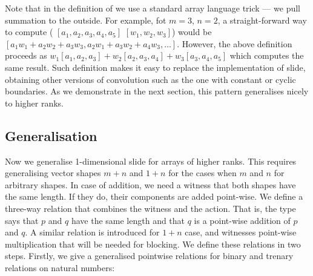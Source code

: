 Note that in the definition of  we use a standard array language
trick --- we pull summation to the outside.  For example, fot $m = 3$, $n = 2$,
a straight-forward way to compute ( $[a_1, a_2, a_3, a_4, a_5]$
$[w_1, w_2, w_3]$) would be $[a_1w_1 + a_2w_2 + a_3w_3, a_2w_1 + a_3w_2 +
a_4w_3,\dots]$.  However, the above definition proceeds as $w_1[a_1,a_2,a_3] +
w_2[a_2,a_3,a_4] + w_3[a_3,a_4,a_5]$ which computes the same result.  Such
definition makes it easy to replace the implementation of slide, obtaining
other versions of convolution such as the one with constant or cyclic
boundaries.  As we demonstrate in the next section, this pattern generalises
nicely to higher ranks.



\subsection{Generalisation\label{sec:general-ix-ops}}
Now we generalise 1-dimensional slide for arrays of higher ranks.
This requires generalising vector shapes $m + n$ and $1 + n$ for the cases
when $m$ and $n$ for arbitrary shapes.  In case of addition, we need a witness
that both shapes
have the same length.  If they do, their components are added point-wise.
We define a three-way relation  that combines the witness and
the action.  That is, the type  \AF{+}    says that
$p$ and $q$ have the same length and that $q$ is a point-wise addition
of $p$ and $q$.  A similar relation  is introduced for $1 + n$
case, and  witnesses point-wise
multiplication that will be needed for blocking.  We define these relations
in two steps.  Firstly, we give a generalised pointwise relations for binary
and trenary relations on natural numbers:

